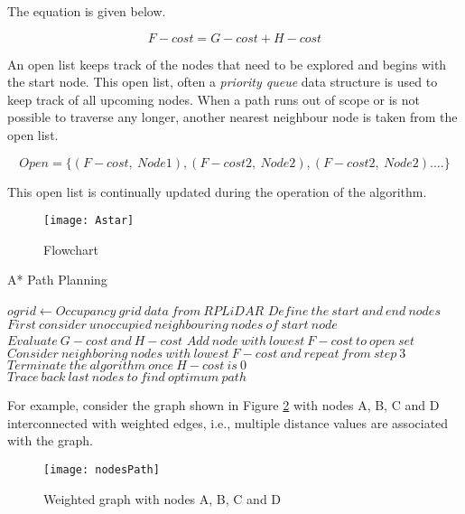 The equation is given below.

\[F-cost = G-cost + H-cost\]

An open list keeps track of the nodes that need to be explored and begins with the start node. This open list, often a \emph{priority queue} data structure is used to keep track of all upcoming nodes. When a path runs out of scope or is not possible to traverse any longer, another nearest neighbour node is taken from the open list.

\[Open = \{(F-cost, \ Node1),(F-cost2, \ Node2), (F-cost2, \ Node2) .... \}\]

This open list is continually updated during the operation of the algorithm.

\newpage
\begin{figure}
    \centering
    \texttt{[image: Astar]}
    \caption{Flowchart}
    \label{fig:pathPlanningFlowchart}
\end{figure}

\vspace{2cm}
\begin{algorithm}[hbt!]
    \caption{A* Path Planning}
    \label{alg:AStarAlgorithm}
    
    \begin{algorithmic}[1]
    
        \Require $ogrid \gets Occupancy \ grid \ data \ from \ RPLiDAR$
        \State $Define \ the \ start \ and \ end\ nodes$
        \State $First \ consider \ unoccupied \ neighbouring \ nodes \ of \ start \ node$
        \State $Evaluate \ G-cost \ and \ H-cost$
        \State $Add \ node \ with \ lowest \ F-cost \ to \ open \ set$
        \State $Consider \ neighboring \ nodes \ with \ lowest \ F-cost \ and \ repeat \ from \ step \ 3 $
        \State $Terminate \ the \ algorithm \ once \ H-cost \ is \ 0 $
        \State $Trace \ back \ last \ nodes\ to \ find \ optimum \ path$
        
    \end{algorithmic}
\end{algorithm}

For example, consider the graph shown in Figure \ref{fig:weightedGraph} with nodes A, B, C and D interconnected with weighted edges, i.e., multiple distance values are associated with the graph.

\begin{figure}[H]
    \centering
    \texttt{[image: nodesPath]}
    \caption{Weighted graph with nodes A, B, C and D}
    \label{fig:weightedGraph}
\end{figure}

